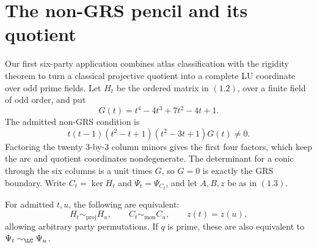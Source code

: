 \section{The non-GRS pencil and its quotient}\label{sec:pencil}

Our first six-party application combines atlas classification with the
rigidity theorem to turn a classical projective quotient into a complete
LU coordinate over odd prime fields.
Let \(H_t\) be the ordered matrix in \((1.2)\), over a finite field of odd
order, and put
\[
G(t)=t^4-4t^3+7t^2-4t+1.
\]
The admitted non-GRS condition is
\[
t(t-1)(t^2-t+1)(t^2-3t+1)G(t)\ne0.                    \tag{7.1}
\]
Factoring the twenty \(3\)-by-\(3\) column minors gives the first four
factors, which keep the arc and quotient coordinates nondegenerate.
The determinant for a conic through the six columns is a unit times
\(G\), so \(G=0\) is exactly the GRS boundary.  Write
\(C_t=\ker H_t\) and \(\Psi_t=\Psi_{C_t}\), and let \(A,B,z\) be as in
\((1.3)\).

\begin{theorem}\label{thm:lc-pencil}
For admitted \(t,u\), the following are equivalent:
\[
H_t\sim_{\mathrm{proj}}H_u,\qquad
C_t\sim_{\mathrm{mon}}C_u,\qquad z(t)=z(u),
\]
allowing arbitrary party permutations.  If \(q\) is prime, these are
also equivalent to \(\Psi_t\sim_{\LC}\Psi_u\).
\end{theorem}

\AMEFigureSix

